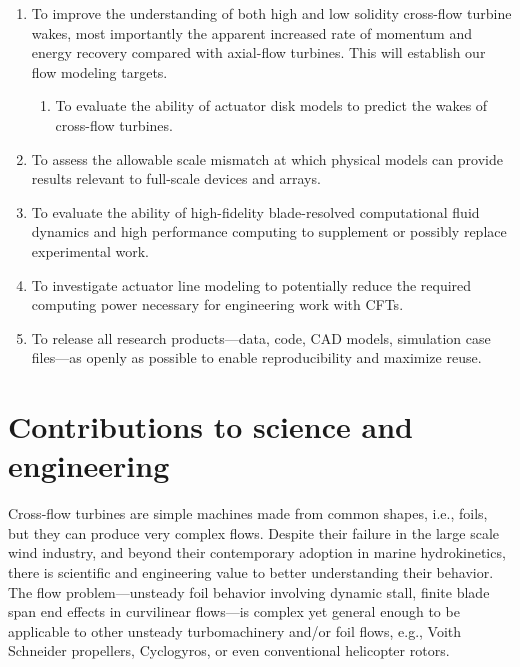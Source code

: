 \begin{enumerate}
	\item To improve the understanding of both high and low solidity cross-flow
    turbine wakes, most importantly the apparent increased rate of momentum and
    energy recovery compared with axial-flow turbines. This will establish our flow
    modeling targets.

    \begin{enumerate}
        \item To evaluate the ability of actuator disk models to predict the
        wakes of cross-flow turbines.
    \end{enumerate}

	\item To assess the allowable scale mismatch at which physical models can
	provide results relevant to full-scale devices and arrays.

	\item To evaluate the ability of high-fidelity blade-resolved computational
    fluid dynamics and high performance computing to supplement or possibly replace
    experimental work.

    \item To investigate actuator line modeling to potentially reduce the
    required computing power necessary for engineering work with CFTs.

    \item To release all research products---data, code, CAD models, simulation
    case files---as openly as possible to enable reproducibility and maximize
    reuse.
\end{enumerate}


\section{Contributions to science and engineering}

Cross-flow turbines are simple machines made from common shapes, i.e., foils,
but they can produce very complex flows. Despite their failure in the large
scale wind industry, and beyond their contemporary adoption in marine
hydrokinetics, there is scientific and engineering value to better understanding
their behavior. The flow problem---unsteady foil behavior involving dynamic
stall, finite blade span end effects in curvilinear flows---is complex yet
general enough to be applicable to other unsteady turbomachinery and/or foil
flows, e.g., Voith Schneider propellers, Cyclogyros, or even conventional
helicopter rotors.


